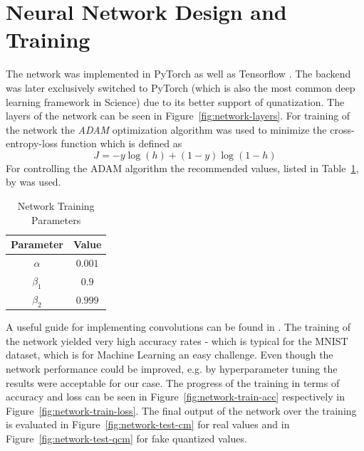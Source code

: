 \section{Neural Network Design and Training}
\label{subsec:nntraining}


The network was implemented in PyTorch \cite{Paszke:2019aa} as well as Tensorflow \cite{MartinAbadi:2015aa}. The backend was later exclusively switched to PyTorch (which is also the most common deep learning framework in Science) due to its better support of qunatization. The layers of the network can be seen in Figure~\ref{fig:network-layers}. 
For training of the network the \emph{ADAM} optimization algorithm \cite{Kingma:2014aa} was used to minimize the cross-entropy-loss function which is defined as
\begin{equation}
    J = - y  \log(h) + (1-y)  \log(1-h)
\end{equation}
For controlling the ADAM algorithm the recommended values, listed in Table~\ref{tab:train-params}, by \cite{Kingma:2014aa} was used.
\begin{table}[ht]
	\centering
    \caption{Network Training Parameters}
    \begin{tabular}{cc}
        \toprule
            Parameter & Value \\
        \midrule
            $\alpha$   & $0.001$ \\
            $\beta_1$  & $0.9$   \\
            $\beta_2$  & $0.999$  \\          
        \bottomrule
    \end{tabular}
    \label{tab:train-params}
\end{table}


A useful guide for implementing convolutions can be found in \cite{dumoulin2016guide}. The training 
of the network yielded very high accuracy rates - which is typical for the MNIST dataset, which is for
Machine Learning an easy challenge. Even though the network performance could be improved, e.g. by 
hyperparameter tuning the results were acceptable for our case. The progress of the training in terms
of accuracy and loss can be seen in Figure~\ref{fig:network-train-acc} respectively in Figure~\ref{fig:network-train-loss}.
The final output of the network over the training is evaluated in Figure~\ref{fig:network-test-cm} for real
values and in Figure~\ref{fig:network-test-qcm} for fake quantized values.

